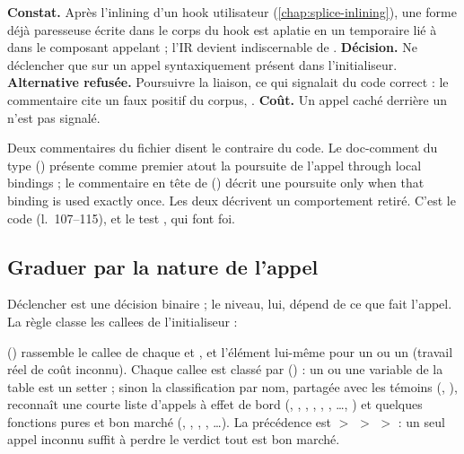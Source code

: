 \begin{decision}
\textbf{Constat.} Après l'inlining d'un hook utilisateur (\cref{chap:splice-inlining}), une forme déjà paresseuse  écrite dans le corps du hook est aplatie en un temporaire lié à  dans le composant appelant ; l'IR devient indiscernable de . \textbf{Décision.} Ne déclencher que sur un appel syntaxiquement présent dans l'initialiseur. \textbf{Alternative refusée.} Poursuivre la liaison, ce qui signalait du code correct : le commentaire cite un faux positif du corpus, . \textbf{Coût.} Un appel caché derrière un  n'est pas signalé.
\end{decision}

\begin{piege}
Deux commentaires du fichier disent le contraire du code. Le doc-comment du type () présente comme premier atout la poursuite de l'appel \og through local bindings\fg{} ; le commentaire en tête de  () décrit une poursuite \og only when that binding is used exactly once\fg. Les deux décrivent un comportement retiré. C'est le code (l.~107--115), et le test , qui font foi.
\end{piege}

\subsection{Graduer par la nature de l'appel}

Déclencher est une décision binaire ; le niveau, lui, dépend de ce que fait l'appel. La règle classe les callees de l'initialiseur :


 () rassemble le callee de chaque  et , et l'élément lui-même pour un  ou un  (travail réel de coût inconnu). Chaque callee est classé par  () : un  ou une variable de la table  est un setter ; sinon la classification par nom, partagée avec les témoins (, ), reconnaît une courte liste d'appels à effet de bord (, , , , , , \ldots, ) et quelques fonctions pures et bon marché (, , , , \ldots). La précédence est  $>$  $>$  $>$  : un seul appel inconnu suffit à perdre le verdict \og tout est bon marché\fg.

